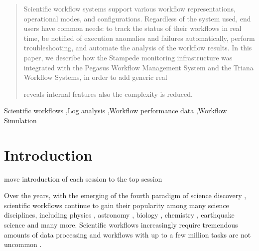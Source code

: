 \documentclass[final,5p,times,twocolumn]{elsarticle}
\begin{document}
\begin{frontmatter}
\begin{abstract}
Scientific workflow systems support various workflow representations, operational modes, and configurations. Regardless of the system used, end users have common needs: to track the status of their workflows in real time, be notified of execution anomalies and failures automatically, perform troubleshooting, and automate the analysis of the workflow results. In this paper, we describe how the Stampede monitoring
infrastructure was integrated with the Pegasus
Workflow Management System and the Triana
Workflow Systems, in order to add generic real

reveals internal features also the complexity is reduced. 
\end{abstract}

\begin{keyword}

Scientific workflows \sep Log analysis \sep Workflow performance data \sep Workflow Simulation

\end{keyword}

\end{frontmatter}

\section{Introduction}
\label{intro}

move introduction of each session to the top session

Over the years, with the emerging of the fourth paradigm of science discovery \cite{Hey2009}, scientific workflows continue to gain their popularity among many science disciplines, including physics \cite{Deelman2002}, astronomy \cite{Sakellariou2010}, biology \cite{Lathers2006, Oinn2004}, chemistry \cite{Wieczorek2005}, earthquake science \cite{Maechling2007} and many more. Scientific workflows increasingly require tremendous amounts of data processing and workflows with up to a few million tasks are not uncommon \cite{Callaghan2011}. 

\end{document}

